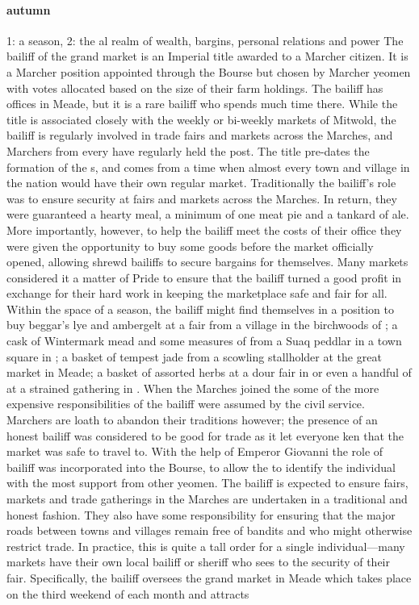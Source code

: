 \paragraph{autumn} 1: a season,  2: the al realm of wealth, bargins, personal relations and power 
 The bailiff of the grand market is an Imperial title awarded to a Marcher citizen. It is a Marcher position appointed through the Bourse but chosen by Marcher yeomen with votes allocated based on the size of their farm holdings. The bailiff has offices in Meade, but it is a rare bailiff who spends much time there. While the title is associated closely with the weekly or bi-weekly markets of Mitwold, the bailiff is regularly involved in trade fairs and markets across the Marches, and Marchers from every  have regularly held the post. \localpar The title pre-dates the formation of the s, and comes from a time when almost every town and village in the nation would have their own regular market. Traditionally the bailiff's role was to ensure security at fairs and markets across the Marches. In return, they were guaranteed a hearty meal, a minimum of one meat pie and a tankard of ale. \localpar More importantly, however, to help the bailiff meet the costs of their office they were given the opportunity to buy some goods before the market officially opened, allowing shrewd bailiffs to secure bargains for themselves. Many markets considered it a matter of Pride to ensure that the bailiff turned a good profit in exchange for their hard work in keeping the marketplace safe and fair for all. Within the space of a season, the bailiff might find themselves in a position to buy beggar's lye and ambergelt at a fair from a village in the birchwoods of ; a cask of Wintermark mead and some measures of  from a Suaq peddlar in a town square in ; a basket of tempest jade from a scowling stallholder at the great market in Meade; a basket of assorted herbs at a dour fair in  or even a handful of  at a strained gathering in . \localpar When the Marches joined the  some of the more expensive responsibilities of the bailiff were assumed by the civil service. Marchers are loath to abandon their traditions however; the presence of an honest bailiff was considered to be good for trade as it let everyone ken that the market was safe to travel to. With the help of Emperor Giovanni the role of bailiff was incorporated into the Bourse, to allow the  to identify the individual with the most support from other yeomen. \localpar The bailiff is expected to ensure fairs, markets and trade gatherings in the Marches are undertaken in a traditional and honest fashion. They also have some responsibility for ensuring that the major roads between towns and villages remain free of bandits and  who might otherwise restrict trade. In practice, this is quite a tall order for a single individual—many markets have their own local bailiff or sheriff who sees to the security of their fair. Specifically, the bailiff oversees the grand market in Meade which takes place on the third weekend of each month and attracts 
